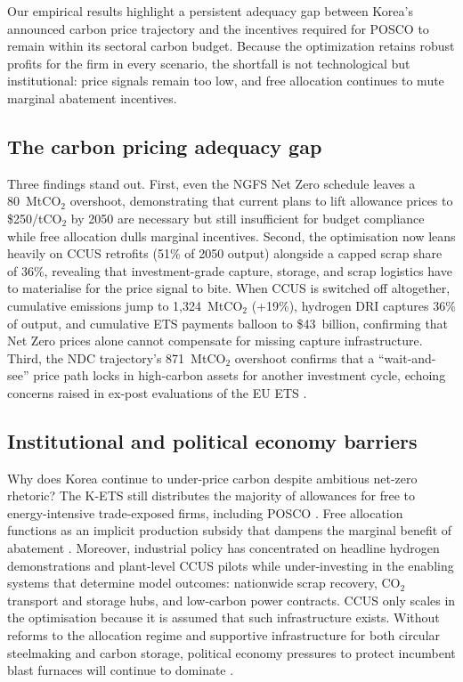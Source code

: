 \documentclass[preprint,1p,authoryear]{elsarticle}
\begin{document}
Our empirical results highlight a persistent adequacy gap between Korea's announced carbon price trajectory and the incentives required for POSCO to remain within its sectoral carbon budget. Because the optimization retains robust profits for the firm in every scenario, the shortfall is not technological but institutional: price signals remain too low, and free allocation continues to mute marginal abatement incentives.

\subsection{The carbon pricing adequacy gap}

Three findings stand out. First, even the NGFS Net Zero schedule leaves a 80~MtCO$_2$ overshoot, demonstrating that current plans to lift allowance prices to \$250/tCO$_2$ by 2050 are necessary but still insufficient for budget compliance while free allocation dulls marginal incentives. Second, the optimisation now leans heavily on CCUS retrofits (51\% of 2050 output) alongside a capped scrap share of 36\%, revealing that investment-grade capture, storage, and scrap logistics have to materialise for the price signal to bite. When CCUS is switched off altogether, cumulative emissions jump to 1,324~MtCO$_2$ (+19\%), hydrogen DRI captures 36\% of output, and cumulative ETS payments balloon to \$43~billion, confirming that Net Zero prices alone cannot compensate for missing capture infrastructure. Third, the NDC trajectory's 871~MtCO$_2$ overshoot confirms that a “wait-and-see” price path locks in high-carbon assets for another investment cycle, echoing concerns raised in ex-post evaluations of the EU ETS \citep{Green2021, martin2016industry}.

\subsection{Institutional and political economy barriers}

Why does Korea continue to under-price carbon despite ambitious net-zero rhetoric? The K-ETS still distributes the majority of allowances for free to energy-intensive trade-exposed firms, including POSCO \citep{kim2021kets, ICAP2024}. Free allocation functions as an implicit production subsidy that dampens the marginal benefit of abatement \citep{neuhoff2012inclusion}. Moreover, industrial policy has concentrated on headline hydrogen demonstrations and plant-level CCUS pilots while under-investing in the enabling systems that determine model outcomes: nationwide scrap recovery, CO$_2$ transport and storage hubs, and low-carbon power contracts. CCUS only scales in the optimisation because it is assumed that such infrastructure exists. Without reforms to the allocation regime and supportive infrastructure for both circular steelmaking and carbon storage, political economy pressures to protect incumbent blast furnaces will continue to dominate \citep{MaterialEconomics2019}.
\end{document}
